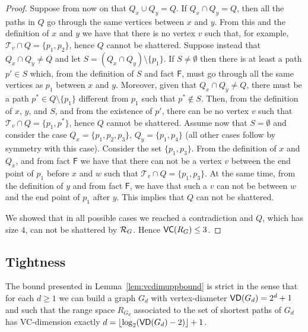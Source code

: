 \begin{proof}
  Suppose from now on that $Q_x\cup Q_y=Q$.  If $Q_x\cap Q_y=Q$, then
  all the paths in $Q$ go through the same vertices between $x$ and $y$. From
  this and the definition of $x$ and $y$ we have that there is no vertex $v$
  such that, for example, $\mathcal{T}_v\cap Q=\{p_1,p_2\}$, hence $Q$ cannot be
  shattered. Suppose instead that $Q_x\cap Q_y\neq Q$ and let $S=(Q_x\cap
  Q_y)\setminus\{p_1\}$. If $S\neq\emptyset$ then there is at least a path
  $p'\in S$ which, from the definition of $S$ and fact $\mathsf{F}$, must go
  through all the same vertices as $p_1$ between $x$ and $y$. Moreover, given
  that $Q_x\cap Q_y\neq Q$, there must be a path $p^*\in Q\setminus\{p_1\}$
  different from $p_1$ such that $p^*\notin S$. Then, from the definition of
  $x$, $y$, and $S$, and from the existence of $p'$, there can be no vertex $v$
  such that $\mathcal{T}_v\cap Q=\{p_1,p^*\}$, hence $Q$ cannot be shattered.
  Assume now that $S=\emptyset$ and consider the case $Q_x=\{p_1,p_2,p_3\}$,
  $Q_y=\{p_1,p_4\}$ (all other cases follow by symmetry with this case).
  Consider the set $\{p_1,p_3\}$. From the definition of $x$ and $Q_x$, and from
  fact $\mathsf{F}$ we have that there can not be a vertex $v$ between the end
  point of $p_1$ before $x$ and $w$ such that $\mathcal{T}_v\cap Q=\{p_1,p_3\}$.
  At the same time, from the definition of $y$ and from fact $\mathsf{F}$, we
  have that such a $v$ can not be between $w$ and the end point of $p_1$ after
  $y$. This implies that $Q$ can not be shattered.

  We showed that in all possible cases we reached a contradiction and $Q$,
  which has size $4$, can not be shattered by $\mathcal{R}_G$. Hence $\mathsf{VC}(R_G)\le
  3$.
\end{proof}

\subsection{Tightness}\label{sec:centrsampltightness}
The bound presented in Lemma~\ref{lem:vcdimuppbound} is strict in the sense that
for each $d\ge 1$ we can build a graph $G_d$ with vertex-diameter
$\mathsf{VD}(G_d)=2^d+1$ and such that the range space $R_{G_d}$ associated to the set of
shortest paths of $G_d$ has VC-dimension exactly
$d=\lfloor\log_2(\mathsf{VD}(G_d)-2)\rfloor+1$. 


